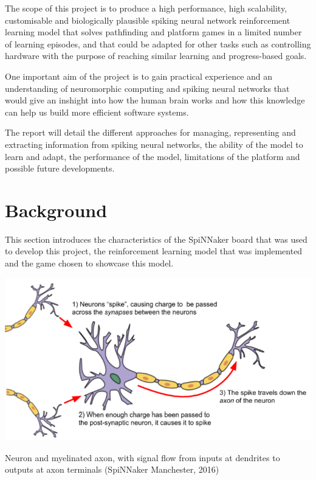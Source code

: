 \documentclass[10pt]{article}
\begin{document}
    The scope of this project is to produce a high performance, high scalability, customisable and biologically plausible spiking neural network reinforcement learning model that solves pathfinding and platform games in a limited number of learning episodes, and that could be adapted for other tasks such as controlling hardware with the purpose of reaching similar learning and progress-based goals.

    One important aim of the project is to gain practical experience and an understanding of neuromorphic computing and spiking neural networks that would give an inshight into how the human brain works and how this knowledge can help us build more efficient software systems.

    The report will detail the different approaches for managing, representing and extracting information from spiking neural networks, the ability of the model to learn and adapt, the performance of the model, limitations of the platform and possible future developments.

    \section{Background}

    This section introduces the characteristics of the SpiNNaker board that was used to develop this project, the reinforcement learning model that was implemented and the game chosen to showcase this model.

    \begin{suppfigure*}[b]
    \center
    \includegraphics[width=150mm]{./neurons.png}
    \caption{Neuron and myelinated axon, with signal flow from inputs at dendrites to outputs at axon terminals (SpiNNaker Manchester, 2016)}
    \label{fig:neurons}
    \end{suppfigure*}
\end{document}
